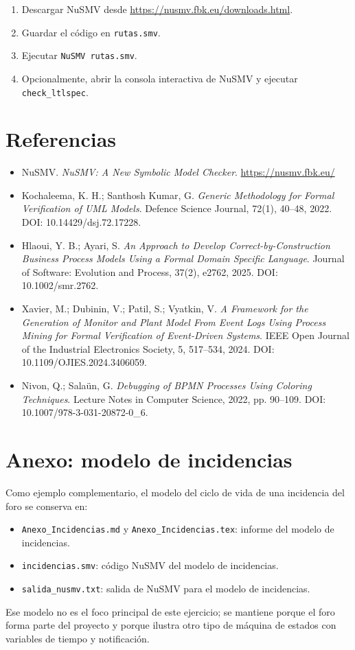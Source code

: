 \documentclass[11pt,a4paper]{article}
\begin{document}
\begin{enumerate}
  \item Descargar NuSMV desde \url{https://nusmv.fbk.eu/downloads.html}.
  \item Guardar el código en \texttt{rutas.smv}.
  \item Ejecutar \texttt{NuSMV rutas.smv}.
  \item Opcionalmente, abrir la consola interactiva de NuSMV y ejecutar \texttt{check\_ltlspec}.
\end{enumerate}

\section{Referencias}

\begin{itemize}
  \item NuSMV. \emph{NuSMV: A New Symbolic Model Checker}. \url{https://nusmv.fbk.eu/}
  \item Kochaleema, K. H.; Santhosh Kumar, G. \emph{Generic Methodology for Formal Verification of UML Models}. Defence Science Journal, 72(1), 40--48, 2022. DOI: 10.14429/dsj.72.17228.
  \item Hlaoui, Y. B.; Ayari, S. \emph{An Approach to Develop Correct-by-Construction Business Process Models Using a Formal Domain Specific Language}. Journal of Software: Evolution and Process, 37(2), e2762, 2025. DOI: 10.1002/smr.2762.
  \item Xavier, M.; Dubinin, V.; Patil, S.; Vyatkin, V. \emph{A Framework for the Generation of Monitor and Plant Model From Event Logs Using Process Mining for Formal Verification of Event-Driven Systems}. IEEE Open Journal of the Industrial Electronics Society, 5, 517--534, 2024. DOI: 10.1109/OJIES.2024.3406059.
  \item Nivon, Q.; Salaün, G. \emph{Debugging of BPMN Processes Using Coloring Techniques}. Lecture Notes in Computer Science, 2022, pp. 90--109. DOI: 10.1007/978-3-031-20872-0\_6.
\end{itemize}

\section{Anexo: modelo de incidencias}

Como ejemplo complementario, el modelo del ciclo de vida de una incidencia del foro se conserva en:
\begin{itemize}
  \item \texttt{Anexo\_Incidencias.md} y \texttt{Anexo\_Incidencias.tex}: informe del modelo de incidencias.
  \item \texttt{incidencias.smv}: código NuSMV del modelo de incidencias.
  \item \texttt{salida\_nusmv.txt}: salida de NuSMV para el modelo de incidencias.
\end{itemize}

Ese modelo no es el foco principal de este ejercicio; se mantiene porque el foro forma parte del proyecto y porque ilustra otro tipo de máquina de estados con variables de tiempo y notificación.
\end{document}
